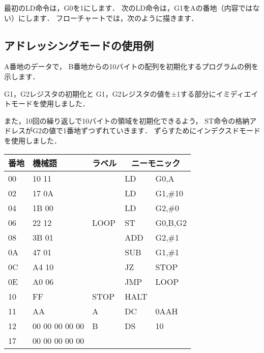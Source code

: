最初のLD命令は，G0を1にします．
次のLD命令は，G1をAの番地（内容ではない）にします．
フローチャートでは，次のように描きます．

\begin{center}
\end{center}

\subsection{アドレッシングモードの使用例}
A番地のデータで，
B番地からの10バイトの配列を初期化するプログラムの例を示します．

G1，G2レジスタの初期化と
G1，G2レジスタの値を±1する部分にイミディエイトモードを使用しました．

また，10回の繰り返しで10バイトの領域を初期化できるよう，
ST命令の格納アドレスがG2の値で1番地ずつずれていきます．
ずらすためにインデクスドモードを使用しました．

{\small\ttfamily\begin{center}
  \begin{tabular}{|l|l|l|l l|} \hline
    番地 & 機械語 & ラベル & \multicolumn{2}{|c|}{ニーモニック} \\
    \hline
    00 & 10 11 &      & LD   & G0,A          \\
    02 & 17 0A &      & LD   & G1,\#10       \\
    04 & 1B 00 &      & LD   & G2,\#0        \\
    06 & 22 12 & LOOP & ST   & G0,B,G2       \\
    08 & 3B 01 &      & ADD  & G2,\#1        \\
    0A & 47 01 &      & SUB  & G1,\#1        \\
    0C & A4 10 &      & JZ   & STOP          \\
    0E & A0 06 &      & JMP  & LOOP          \\
    10 & FF    & STOP & HALT &               \\
    11 & AA    & A    & DC   & 0AAH          \\
    12 & 00 00 00 00 00 & B    & DS   & 10            \\
    17 & 00 00 00 00 00 &      &      &               \\
    \hline
  \end{tabular}
\end{center}}

